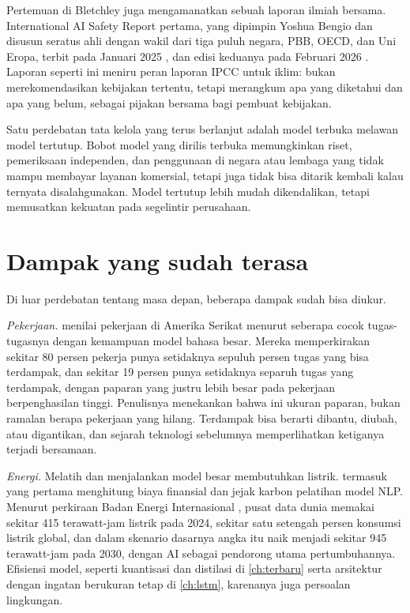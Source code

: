 Pertemuan di Bletchley juga mengamanatkan sebuah laporan ilmiah bersama. International AI Safety Report pertama, yang dipimpin Yoshua
Bengio dan disusun seratus ahli dengan wakil dari tiga puluh negara, PBB, OECD, dan Uni Eropa, terbit pada Januari 2025
\citep{bengio2025iasr}, dan edisi keduanya pada Februari 2026 \citep{iasr2026}. Laporan seperti ini meniru peran laporan IPCC untuk
iklim: bukan merekomendasikan kebijakan tertentu, tetapi merangkum apa yang diketahui dan apa yang belum, sebagai pijakan bersama bagi
pembuat kebijakan.

Satu perdebatan tata kelola yang terus berlanjut adalah model terbuka melawan model tertutup. Bobot model yang dirilis terbuka
memungkinkan riset, pemeriksaan independen, dan penggunaan di negara atau lembaga yang tidak mampu membayar layanan komersial, tetapi
juga tidak bisa ditarik kembali kalau ternyata disalahgunakan. Model tertutup lebih mudah dikendalikan, tetapi memusatkan kekuatan
pada segelintir perusahaan.

\section{Dampak yang sudah terasa}

Di luar perdebatan tentang masa depan, beberapa dampak sudah bisa diukur.

\emph{Pekerjaan.} \citet{eloundou2023} menilai pekerjaan di Amerika Serikat menurut seberapa cocok tugas-tugasnya dengan kemampuan model
bahasa besar. Mereka memperkirakan sekitar 80 persen pekerja punya setidaknya sepuluh persen tugas yang bisa terdampak, dan sekitar 19
persen punya setidaknya separuh tugas yang terdampak, dengan paparan yang justru lebih besar pada pekerjaan berpenghasilan tinggi.
Penulisnya menekankan bahwa ini ukuran paparan, bukan ramalan berapa pekerjaan yang hilang. Terdampak bisa berarti dibantu, diubah,
atau digantikan, dan sejarah teknologi sebelumnya memperlihatkan ketiganya terjadi bersamaan.

\emph{Energi.} Melatih dan menjalankan model besar membutuhkan listrik. \citet{strubell2019} termasuk yang pertama menghitung biaya
finansial dan jejak karbon pelatihan model NLP. Menurut perkiraan Badan Energi Internasional \citep{iea2025}, pusat data dunia memakai
sekitar 415 terawatt-jam listrik pada 2024, sekitar satu setengah persen konsumsi listrik global, dan dalam skenario dasarnya angka itu
naik menjadi sekitar 945 terawatt-jam pada 2030, dengan AI sebagai pendorong utama pertumbuhannya. Efisiensi model, seperti kuantisasi
dan distilasi di \cref{ch:terbaru} serta arsitektur dengan ingatan berukuran tetap di \cref{ch:lstm}, karenanya juga persoalan lingkungan.

